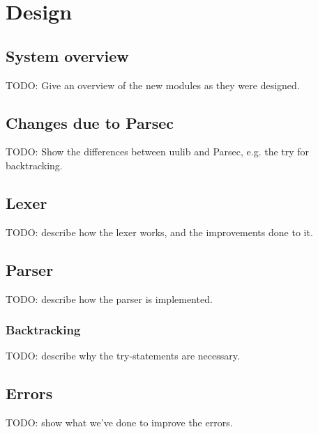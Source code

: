
\section{Design}
\label{sec:design}

\subsection{System overview}
TODO: Give an overview of the new modules as they were designed.

\subsection{Changes due to Parsec}
TODO: Show the differences between uulib and Parsec, e.g. the try for backtracking.

\subsection{Lexer}
TODO: describe how the lexer works, and the improvements done to it.

\subsection{Parser}
TODO: describe how the parser is implemented.

\subsubsection{Backtracking}
TODO: describe why the try-statements are necessary.

\subsection{Errors}
TODO: show what we've done to improve the errors.
